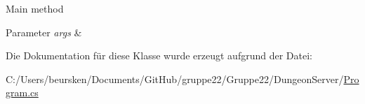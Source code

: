 Main method 


\begin{DoxyParams}{Parameter}
{\em args} & \\
\hline
\end{DoxyParams}


Die Dokumentation für diese Klasse wurde erzeugt aufgrund der Datei\-:\begin{DoxyCompactItemize}
\item 
C\-:/\-Users/beursken/\-Documents/\-Git\-Hub/gruppe22/\-Gruppe22/\-Dungeon\-Server/\hyperlink{_dungeon_server_2_program_8cs}{Program.\-cs}\end{DoxyCompactItemize}
